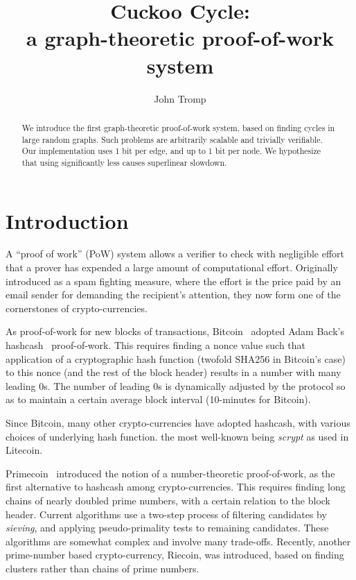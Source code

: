 \documentclass[11pt, oneside]{article}
\title{Cuckoo Cycle: \protect\\ a graph-theoretic proof-of-work system}
\author{John Tromp}
\begin{document}
\maketitle

\begin{abstract}
We introduce the first graph-theoretic proof-of-work system,
based on finding cycles in large random graphs.
Such problems are arbitrarily scalable and trivially verifiable.
Our implementation uses 1 bit per edge, and up to 1 bit per node.
We hypothesize that using significantly less causes superlinear slowdown.
\end{abstract}

\section{Introduction}
A ``proof of work'' (PoW) system allows a verifier to check with negligible
effort that a prover has expended a large amount of computational effort.
Originally introduced as a spam fighting measure, 
where the effort is the price paid by an email sender for demanding the
recipient's attention, they now form one of the cornerstones of
crypto-currencies.

As proof-of-work for new blocks of transactions,
Bitcoin~\cite{nakamoto2009bitcoin} adopted Adam Back's hashcash~\cite{back2002} proof-of-work.
This requires finding a nonce value such that
application of a cryptographic hash function (twofold SHA256 in Bitcoin's case)
to this nonce (and the rest of the block header) results in a number with
many leading 0s. The number of leading 0s is dynamically adjusted by the protocol
so as to maintain a certain average block interval (10-minutes for Bitcoin).

Since Bitcoin, many other crypto-currencies have adopted hashcash, with various
choices of underlying hash function. the most well-known being {\em scrypt} as
used in Litecoin.

Primecoin~\cite{king2013} introduced the notion of a number-theoretic proof-of-work,
as the first alternative to hashcash among crypto-currencies.
This requires finding long chains of nearly doubled prime numbers, with a certain
relation to the block header.
Current algorithms use a two-step process of filtering candidates by {\em sieving},
and applying pseudo-primality tests to remaining candidates.
These algorithms are somewhat complex and involve many trade-offs.
Recently, another prime-number based crypto-currency, Riecoin, was introduced, based
on finding clusters rather than chains of prime numbers.
\end{document}
